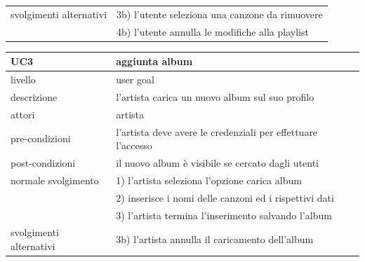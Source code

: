 \documentclass{article}
\begin{document}
\begin{center}
\begin{tabular}{|l|l|}
  \\
  \hline
  svolgimenti alternativi & 3b) l'utente seleziona una canzone da rimuovere\\
                          & 4b) l'utente annulla le modifiche alla playlist\\
  \hline
  
\end{tabular}

\vspace{40pt}

\begin{tabular}{|l|l|}
  \hline
  \textbf{UC3} & \textbf{aggiunta album}\\
  \hline
    livello & user goal\\
  \hline
    descrizione & l'artista carica un nuovo album sul suo profilo\\
  \hline
    attori & artista\\
  \hline
    pre-condizioni & l'artista deve avere le credenziali per effettuare l'accesso\\
  \hline
    post-condizioni & il nuovo album è visibile se cercato dagli utenti\\
  \hline
  normale svolgimento & 1) l'artista seleziona l'opzione carica album\\
                      & 2) inserisce i nomi delle canzoni ed i rispettivi dati\\
                      & 3) l'artista termina l'inserimento salvando l'album
  \\
  \hline
    svolgimenti alternativi & 3b) l'artista annulla il caricamento dell'album\\
  \hline
  
\end{tabular}

\vspace{40pt}


\end{center}
\end{document}
